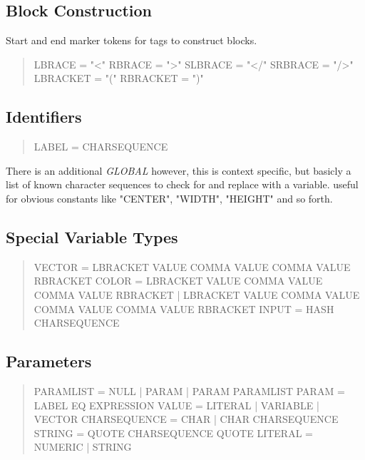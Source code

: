 \documentclass[10pt,a4paper]{article}
\begin{document}
\subsection{Block Construction}
Start and end marker tokens for tags to construct blocks.

\begin{quote}
LBRACE		= "<"\linebreak
RBRACE		= ">"\linebreak
SLBRACE		= "</"\linebreak
SRBRACE		= "/>"\linebreak
LBRACKET	= "("\linebreak
RBRACKET	= ")"
\end{quote}

\subsection{Identifiers}

\begin{quote}
LABEL		= CHARSEQUENCE
\end{quote}

There is an additional \textit{GLOBAL} however, this is context specific, but basicly a list of known character sequences to check for and replace with a variable. useful for obvious constants like "CENTER", "WIDTH", "HEIGHT" and so forth.

\subsection{Special Variable Types}

\begin{quote}
VECTOR = LBRACKET VALUE COMMA VALUE COMMA VALUE RBRACKET\linebreak
COLOR = LBRACKET VALUE COMMA VALUE COMMA VALUE RBRACKET | LBRACKET VALUE COMMA VALUE COMMA VALUE COMMA VALUE RBRACKET\linebreak
INPUT = HASH CHARSEQUENCE
\end{quote}

\subsection{Parameters}

\begin{quote}
PARAMLIST	= NULL | PARAM | PARAM PARAMLIST\linebreak
PARAM		= LABEL EQ EXPRESSION\linebreak
VALUE		= LITERAL | VARIABLE | VECTOR\linebreak
CHARSEQUENCE	= CHAR | CHAR CHARSEQUENCE\linebreak
STRING		= QUOTE CHARSEQUENCE QUOTE\linebreak
LITERAL		= NUMERIC | STRING
\end{quote}
\end{document}
